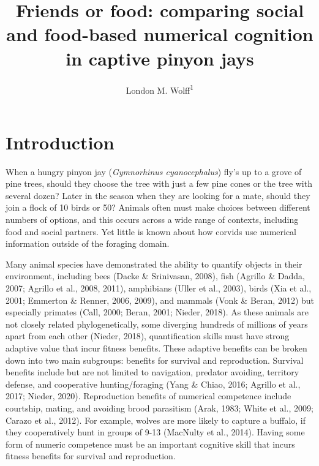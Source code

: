 \documentclass[
  english,
  ,doc,floatsintext]{apa6}
\title{Friends or food: comparing social and food-based numerical cognition in captive pinyon jays}
\author{London M. Wolff\textsuperscript{1}}
\date{}
\affiliation{\vspace{0.5cm}\textsuperscript{1} Department of Psychology, Center for Brain, Biology \& Behavior, University of Nebraska, Lincoln, Lincoln, NE, USA}
\begin{document}
\maketitle

\hypertarget{introduction}{%
\section{Introduction}\label{introduction}}

When a hungry pinyon jay (\emph{Gymnorhinus cyanocephalus}) fly's up to a grove of pine trees, should they choose the tree with just a few pine cones or the tree with several dozen? Later in the season when they are looking for a mate, should they join a flock of 10 birds or 50? Animals often must make choices between different numbers of options, and this occurs across a wide range of contexts, including food and social partners. Yet little is known about how corvids use numerical information outside of the foraging domain.

Many animal species have demonstrated the ability to quantify objects in their environment, including bees (Dacke \& Srinivasan, 2008), fish (Agrillo \& Dadda, 2007; Agrillo et al., 2008, 2011), amphibians (Uller et al., 2003), birds (Xia et al., 2001; Emmerton \& Renner, 2006, 2009), and mammals (Vonk \& Beran, 2012) but especially primates (Call, 2000; Beran, 2001; Nieder, 2018). As these animals are not closely related phylogenetically, some diverging hundreds of millions of years apart from each other (Nieder, 2018), quantification skills must have strong adaptive value that incur fitness benefits. These adaptive benefits can be broken down into two main subgroups: benefits for survival and reproduction. Survival benefits include but are not limited to navigation, predator avoiding, territory defense, and cooperative hunting/foraging (Yang \& Chiao, 2016; Agrillo et al., 2017; Nieder, 2020). Reproduction benefits of numerical competence include courtship, mating, and avoiding brood parasitism (Arak, 1983; White et al., 2009; Carazo et al., 2012). For example, wolves are more likely to capture a buffalo, if they cooperatively hunt in groups of 9-13 (MacNulty et al., 2014). Having some form of numeric competence must be an important cognitive skill that incurs fitness benefits for survival and reproduction.
\end{document}
